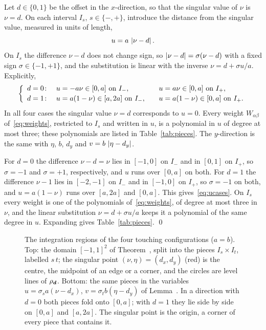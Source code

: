  Let $d\in\{0,1\}$ be the offset in the $x$-direction, so that the singular
value of $\nu$ is $\nu=d$. On each interval $I_s$, $s\in\{-,+\}$, introduce the distance from the singular value,
measured in units of length,
\begin{equation}
    \label{eq:udist}
    u = a\,\left| \nu-d \right| .
\end{equation}
On $I_s$ the difference $\nu-d$ does not change sign, so $\left| \nu-d \right|=\sigma(\nu-d)$ with a fixed sign
$\sigma\in\{-1,+1\}$, and the substitution is linear with the inverse $\nu=d+\sigma u/a$. Explicitly,
\begin{equation}
    \label{eq:ucases}
    \left\{
    \begin{array}{l@{\quad}r@{}l@{\qquad}r@{}l}
        d=0\colon & u & {}=-a\nu\in[0,a] \text{ on } I_-,     & u & {}=a\nu\in[0,a] \text{ on } I_+,\\[2pt]
        d=1\colon & u & {}=a(1-\nu)\in[a,2a] \text{ on } I_-, & u & {}=a(1-\nu)\in[0,a] \text{ on } I_+ .
    \end{array}
    \right.
\end{equation}
In all four cases the singular value $\nu=d$ corresponds to $u=0$. Every weight $W_{\alpha\beta}$ of~\eqref{eq:weights},
restricted to $I_s$ and written in $u$, is a polynomial in $u$ of degree at most three; these polynomials are listed in
Table~\ref{tab:pieces}. The $y$-direction is the same with $\eta$, $b$, $d_y$ and $v=b\,\left| \eta-d_y \right|$.

\vspace{\baselineskip}
\proof For $d=0$ the difference $\nu-d=\nu$ lies in $[-1,0]$ on $I_-$ and in $[0,1]$ on $I_+$, so $\sigma=-1$ and
$\sigma=+1$, respectively, and $u$ runs over $[0,a]$ on both. For $d=1$ the difference $\nu-1$ lies in $[-2,-1]$ on $I_-$
and in $[-1,0]$ on $I_+$, so $\sigma=-1$ on both, and $u=a(1-\nu)$ runs over $[a,2a]$ and $[0,a]$. This
gives~\eqref{eq:ucases}. On $I_s$ every weight is one of the polynomials of~\eqref{eq:weights}, of degree at most three
in $\nu$, and the linear substitution $\nu=d+\sigma u/a$ keeps it a polynomial of the same degree in $u$. Expanding gives
Table~\ref{tab:pieces}. \qed

\begin{figure}[ht]
    \centering
    
    \caption{The integration regions of the four touching configurations ($a=b$). Top: the domain $[-1,1]^2$ of
    Theorem~, split into the pieces $I_s\times I_t$, labelled $s\,t$; the singular point
    $(\nu,\eta)=(d_x,d_y)$ (red) is the centre, the midpoint of an edge or a corner, and the circles are level lines
    of $\rho_{\vb*{d}}$. Bottom: the same pieces in the variables $u=\sigma_sa(\nu-d_x)$, $v=\sigma_tb(\eta-d_y)$ of
    Lemma~. In a direction with $d=0$ both pieces fold onto $[0,a]$; with $d=1$ they lie side by side
    on $[0,a]$ and $[a,2a]$. The singular point is the origin, a corner of every piece that contains it.}
    \label{fig:regions}
\end{figure}

